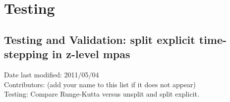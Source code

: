 \documentclass[11pt]{report}
\begin{document}

\chapter{Testing}

\section{Testing and Validation: split explicit time-stepping in z-level mpas}
Date last modified: 2011/05/04 \\
Contributors: (add your name to this list if it does not appear) \\

Testing: Compare Runge-Kutta versus unsplit and split explicit.

\end{document}
